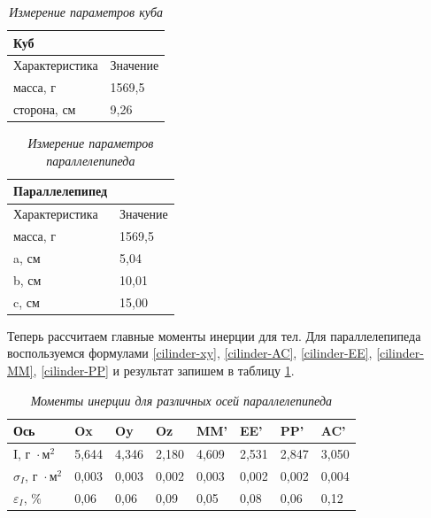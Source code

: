 \documentclass[a4paper, 12pt]{article}
\begin{document}
\begin{table}[!ht]
    \centering
    \begin{tabular}{|l|l|}
    \hline
        \textbf{Куб} & ~ \\ \hline
        Характеристика & Значение \\ \hline
        масса, г & 1569,5 \\ \hline
        сторона, см & 9,26 \\ \hline
    \end{tabular}\caption{\textit{Измерение параметров куба}}
\end{table}

\begin{table}[!ht]
    \centering
    \begin{tabular}{|l|l|}
    \hline
        \textbf{Параллелепипед} & ~ \\ \hline
        Характеристика & Значение \\ \hline
        масса, г & 1569,5 \\ \hline
        a, см & 5,04 \\ \hline
        b, см & 10,01 \\ \hline
        c, см & 15,00 \\ \hline
    \end{tabular}\caption{\textit{Измерение параметров параллелепипеда}}
\end{table}

Теперь рассчитаем главные моменты инерции для тел. Для параллелепипеда воспользуемся формулами \eqref{cilinder-xy}, \eqref{cilinder-AC}, \eqref{cilinder-EE}, \eqref{cilinder-MM}, \eqref{cilinder-PP} и результат запишем в таблицу \ref{paral-i}.

\begin{table}[!ht]
    \centering
    \begin{tabular}{|l|l|l|l|l|l|l|l|}
    \hline
        Ось & Ox & Oy & Oz & MM' & EE' & PP' & AC' \\ \hline
        I, $\text{г } \cdot \text{м}^2$ & 5,644 & 4,346 & 2,180 & 4,609 & 2,531 & 2,847 & 3,050 \\ \hline
        $\sigma_{I}$, $\text{г } \cdot \text{м}^2$ & 0,003 & 0,003 & 0,002 & 0,003 & 0,002 & 0,002 & 0,004 \\ \hline
        $\varepsilon_{I}$, $\%$ & 0,06 & 0,06 & 0,09 & 0,05 & 0,08 & 0,06 & 0,12 \\ \hline
    \end{tabular}\caption{\textit{Моменты инерции для различных осей параллелепипеда}}\label{paral-i}
\end{table}
\end{document}
